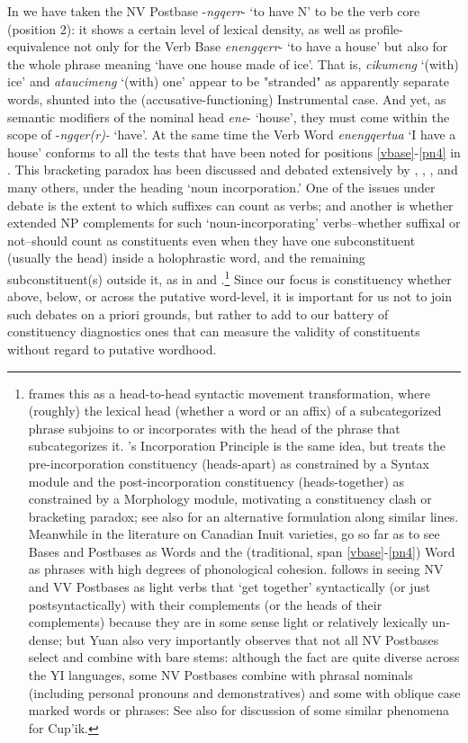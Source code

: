 \documentclass[output=paper]{langscibook}
\begin{document}
In  we have taken the NV Postbase -\textit{ngqerr}{}- `to have N' to be the verb core (position 2): it shows a certain level of lexical density, as well as profile-equivalence not only for the Verb Base \textit{enengqerr}{}- `to have a house' but also for the whole phrase meaning `have one house made of ice'. That is, \textit{cikumeng} `(with) ice' and \textit{ataucimeng} `(with) one' appear to be "stranded" as apparently separate words, shunted into the (accusative-functioning) Instrumental case. And yet, as semantic modifiers of the nominal head \textit{ene}{}- `house', they must come within the scope of -\textit{ngqer(r)-} `have'. At the same time the Verb Word \textit{enengqertua} `I have a house' conforms to all the tests that have been noted for positions \ref{vbase}-\ref{pn4} in . This bracketing paradox has been discussed and debated extensively by \citet{Sadock1980,sadock1991autolexical}, \citet{Mithun1984}, \citet{Baker1988}, and many others, under the heading `noun incorporation.' One of the issues under debate is the extent to which suffixes can count as verbs; and another is whether extended NP complements for such `noun-incorporating' verbs--whether suffixal or not--should count as constituents even when they have one subconstituent (usually the head) inside a holophrastic word, and the remaining subconstituent(s) outside it, as in  and .\footnote{\citet{Baker1988} frames this as a head-to-head syntactic movement transformation, where (roughly) the lexical head (whether a word or an affix) of a subcategorized phrase subjoins to or incorporates with the head of the phrase that subcategorizes it. \citealt{sadock1991autolexical}'s Incorporation Principle is the same idea, but treats the pre-incorporation constituency (heads-apart) as constrained by a Syntax module and the post-incorporation constituency (heads-together) as constrained by a Morphology module, motivating a constituency clash or bracketing paradox; see also \citealt{Woodbury1996} for an alternative formulation along similar lines. Meanwhile in the literature on Canadian Inuit varieties, \citet{Compton2010} go so far as to see Bases and Postbases as Words and the (traditional, span \ref{vbase}-\ref{pn4}) Word as phrases with high degrees of phonological cohesion. \citet{Yuan2018} follows \citet{Johns2007} in seeing NV and VV Postbases as light verbs that `get together' syntactically (or just postsyntactically) with their complements (or the heads of their complements) because they are in some sense light or relatively lexically un-dense; but Yuan also very importantly observes that not all NV Postbases select and combine with bare stems: although the fact are quite diverse across the YI languages, some NV Postbases combine with phrasal nominals (including personal pronouns and demonstratives) and some with oblique case marked words or phrases: See also \citet{Woodbury1996} for discussion of some similar phenomena for Cup'ik.} Since our focus is constituency whether above, below, or across the putative word-level, it is important for us not to join such debates on a priori grounds, but rather to add to our battery of constituency diagnostics ones that can measure the {validity} of constituents without regard to putative wordhood.
\end{document}
